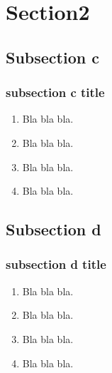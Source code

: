 \section{Section2}
%
\subsection{Subsection c}
\begin{frame}[label=sectionc]
\frametitle{subsection c title} 
\begin{enumerate}
\item Bla bla bla.\\
\item Bla bla bla.\\
\item Bla bla bla.\\
\item Bla bla bla.\\
\end{enumerate}
\end{frame}


%
\subsection{Subsection d}
\begin{frame}[label=sectiond]
\frametitle{subsection d title} 
\begin{enumerate}
\item Bla bla bla.\\
\item Bla bla bla.\\
\item Bla bla bla.\\
\item Bla bla bla.\\
\end{enumerate}
\end{frame}
